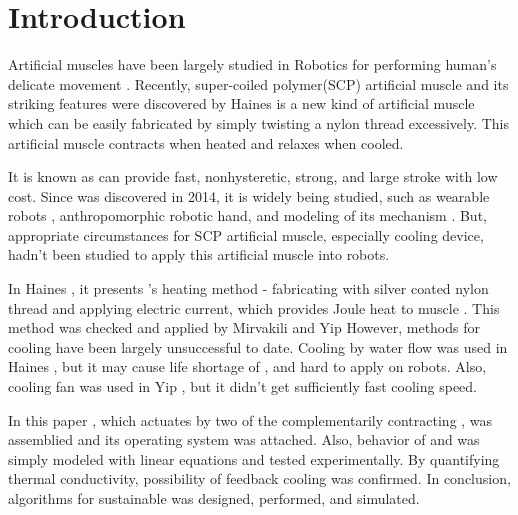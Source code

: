 
\section{Introduction}
Artificial muscles have been largely studied in Robotics for performing human's delicate movement \cite{ashley}. Recently, super-coiled polymer(SCP) artificial muscle and its striking features were discovered by Haines \etal \cite{haines} \scp is a new kind of artificial muscle which can be easily fabricated by simply twisting a nylon thread excessively. This artificial muscle contracts when heated and relaxes when cooled.

It is known as \scp can provide fast\cite{mirvakili}, nonhysteretic, strong, and large stroke with low cost\cite{yuan, mirvakili, madden}. 
Since \scp was discovered in 2014, it is widely being studied, such as
wearable robots \cite{sphincter, kianzad2}, 
anthropomorphic robotic hand\cite{yip, finger}, 
and modeling of its mechanism \cite{treatise, torsional, youngmodulus, fab_coil, multiscale, healing, kianzad, moretti}. 
But, appropriate circumstances for SCP artificial muscle, especially cooling device, hadn't been studied to apply this artificial muscle into robots.

In Haines \etal, it presents \scp 's heating method - fabricating \scp with silver coated nylon thread and applying electric current, which provides Joule heat to muscle \cite{haines}. This method was checked and applied by Mirvakili \etal and Yip \etal \cite{yip, mirvakili} However, methods for cooling \scp have been largely unsuccessful to date. Cooling by water flow was used in Haines \etal, but it may cause life shortage of \scp \cite{haines}, and hard to apply on robots. Also, cooling fan was used in Yip \etal, but it didn't get sufficiently fast cooling speed.

In this paper \antanospace, which actuates by two of the complementarily contracting \scpnospace, was assemblied and its operating system was attached. Also, behavior of \scp and \anta was simply modeled with linear equations and tested experimentally. By quantifying thermal conductivity, possibility of feedback cooling was confirmed. In conclusion, algorithms for sustainable \apc was designed, performed, and simulated.